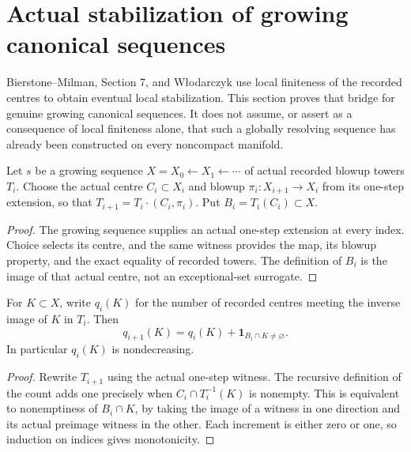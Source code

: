 \section{Actual stabilization of growing canonical sequences}

Bierstone--Milman\cite{bierstone-milman08-functoriality}, Section 7, and
W{\l}odarczyk\cite{wlodarczyk05-hironaka} use local finiteness of the recorded
centres to obtain eventual local stabilization. This section proves that
bridge for genuine growing canonical sequences. It does not assume, or
assert as a consequence of local finiteness alone, that such a globally
resolving sequence has already been constructed on every noncompact manifold.

\begin{definition}
\label{hir:growing-sequence-actual-centres}
\leanok
Let $s$ be a growing sequence $X=X_0\leftarrow X_1\leftarrow\cdots$ of
actual recorded blowup towers $T_i$. Choose the actual centre $C_i\subset X_i$
and blowup $\pi_i:X_{i+1}\to X_i$ from its one-step extension, so that
$T_{i+1}=T_i\mathbin{\cdot}(C_i,\pi_i)$. Put $B_i=T_i(C_i)\subset X$.
\end{definition}
\begin{proof}
The growing sequence supplies an actual one-step extension at every index.
Choice selects its centre, and the same witness provides the map, its blowup
property, and the exact equality of recorded towers. The definition of $B_i$
is the image of that actual centre, not an exceptional-set surrogate.
\end{proof}

\begin{lemma}
\label{hir:growing-sequence-count-step}
\leanok
For $K\subset X$, write $q_i(K)$ for the number of recorded centres meeting
the inverse image of $K$ in $T_i$. Then
\[
 q_{i+1}(K)=q_i(K)+\mathbf 1_{B_i\cap K\ne\varnothing}.
\]
In particular $q_i(K)$ is nondecreasing.
\end{lemma}
\begin{proof}
Rewrite $T_{i+1}$ using the actual one-step witness. The recursive definition
of the count adds one precisely when $C_i\cap T_i^{-1}(K)$ is nonempty.
This is equivalent to nonemptiness of $B_i\cap K$, by taking the image of a
witness in one direction and its actual preimage witness in the other.
Each increment is either zero or one, so induction on indices gives monotonicity.
\end{proof}

